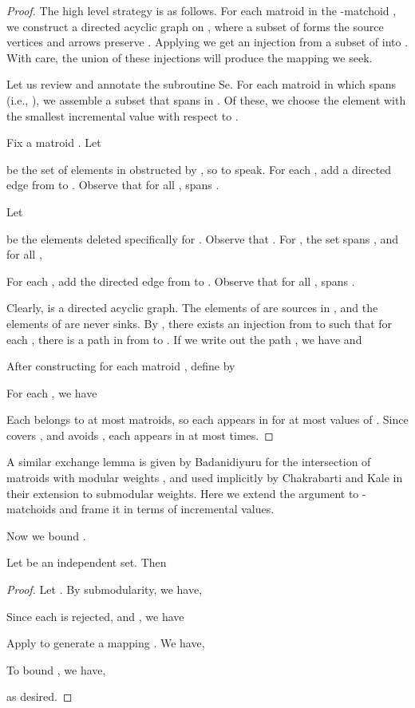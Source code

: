 \documentclass[oneside,letterpaper]{scrartcl} \usepackage{macros}
\begin{document}
\begin{proof}
  The high level strategy is as follows. For each matroid
   in the -matchoid , we construct a
  directed acyclic graph  on , where a
  subset of  forms the source vertices and arrows preserve
  . Applying
   we get an injection from a subset
  of  into . With care, the union of these
  injections will produce the mapping we seek.

  Let us review and annotate the subroutine
  Se. For each matroid
   in which  spans  (i.e., ), we assemble a subset
   that spans  in
  . Of these, we choose the element  with the smallest incremental value with respect to
  .

  Fix a matroid . Let
  
  be the set of elements in  obstructed by , so to
  speak. For each , add a directed edge
   from  to . Observe that for all ,  spans .

  Let
  
  be the elements deleted specifically for .  Observe that
  . For , the set  spans
  , and for all ,
  
  For each , add the directed edge
   from  to . Observe that for all
  ,
   spans .

  Clearly,  is a directed acyclic graph. The elements
  of  are sources in , and the elements of
   are never sinks. By
  , there exists an injection
   from  to  such that for each , there is a path in  from  to
  . If we write out the path , we have  and
  

  After constructing  for each matroid ,
  define  by
  
  For each , we have
  
  Each  belongs to at most  matroids, so each
   appears in  for at most  values
  of .  Since  covers , and
   avoids , each  appears in  at most  times.
\end{proof}
\begin{remark}
  A similar exchange lemma is given by Badanidiyuru for the
  intersection of  matroids with modular weights \cite{abv-11}, and
  used implicitly by Chakrabarti and Kale in their extension to
  submodular weights. Here we extend the argument to -matchoids and
  frame it in terms of incremental values.
\end{remark}

Now we bound .
\begin{lemma}
  Let  be an independent set. Then
  
\end{lemma}
\begin{proof}
  Let . By submodularity, we have,
  
  Since each  is rejected, and , we have
  
  Apply  to generate
  a mapping . We have,
  
  To bound , we have,
  
  as desired.
\end{proof}
\end{document}
